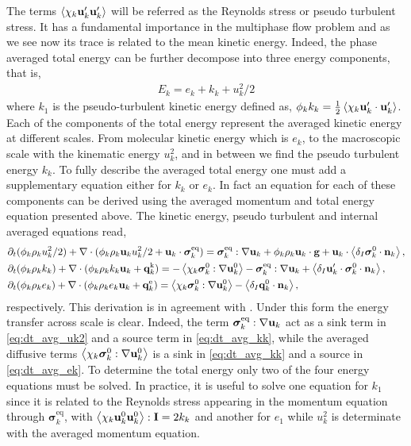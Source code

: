The terms $\left<\chi_k \textbf{u}_k'\textbf{u}_k'\right>$ will be referred as the Reynolds stress or pseudo turbulent stress. 
It has a fundamental importance in the multiphase flow problem and as we see now its trace is related to the mean kinetic energy. 
Indeed, the phase averaged total energy can be further decompose into three energy components, that is,  
\begin{align}
    E_k = e_k + k_k + u_k^2/2
    \label{eq:E_def}
\end{align}
where $k_1$ is the pseudo-turbulent kinetic energy defined as, $\phi_k k_k = \frac{1}{2}\left<\chi_k \textbf{u}_k'\cdot \textbf{u}_k'\right>$. 
Each of the components of the total energy represent the averaged kinetic energy at different scales. 
From molecular kinetic energy which is $e_k$, to the macroscopic scale with the kinematic energy $u_k^2$, and in between we find the pseudo turbulent energy $k_k$. 
To fully describe the averaged total energy one must add a supplementary equation either for $k_k$ or $e_k$. 
In fact an equation for each of these components can be derived using the averaged momentum and total energy equation presented above. 
The kinetic energy, pseudo turbulent and internal averaged equations read, 
\begin{align}
    \label{eq:dt_avg_uk2}
    &\partial_t (\phi_k \rho_ku_k^2/2)  
    + \mathbf{\nabla}\cdot (
        \phi_k \rho_k\textbf{u}_ku_k^2/2
        + \textbf{u}_k \cdot \bm{\sigma}_k^\text{eq}
    )
    = 
    \bm{\sigma}_k^\text{eq} : \mathbf{\nabla} \textbf{u}_k
    + \phi_k \rho_k \textbf{u}_k\cdot \textbf{g} 
    +  \textbf{u}_k\cdot \left<\delta_I \bm{\sigma}_k^0 \cdot \textbf{n}_k\right>,\\
    \label{eq:dt_avg_kk}
    &\partial_t (\phi_k\rho_kk_k)  
    + \mathbf{\nabla}\cdot (
        \phi_k\rho_kk_k\textbf{u}_k
        + \textbf{q}_k^\text{k} 
        )
    = 
    - \left<\chi_k\bm{\sigma}_k^0 : \mathbf{\nabla} \textbf{u}_k^0\right>
    - \bm{\sigma}_k^\text{eq} : \mathbf{\nabla} \textbf{u}_k
    + \left<\delta_I \textbf{u}_k' \cdot \bm{\sigma}_k^0 \cdot \textbf{n}_k\right>,\\
    \label{eq:dt_avg_ek}
    &\partial_t (\phi_k\rho_ke_k)  
    + \mathbf{\nabla}\cdot (
        \phi_k \rho_ke_k\textbf{u}_k
        +
        \textbf{q}_k^\text{e} 
        )
    = 
    \left<\chi_k\bm{\sigma}_k^0 : \mathbf{\nabla} \textbf{u}_k^0\right>
    - \left<\delta_I \textbf{q}_k^0 \cdot \textbf{n}_k\right>,
\end{align}
respectively. 
This derivation is in agreement with \citet{morel2015mathematical}. 
Under this form the energy transfer across scale is clear. 
Indeed, the term $\bm{\sigma}_k^\text{eq} : \mathbf{\nabla} \textbf{u}_k$ act as a sink term in \ref{eq:dt_avg_uk2} and a source term in \ref{eq:dt_avg_kk}, while the averaged diffusive terms $\left<\chi_k\bm{\sigma}_k^0 : \mathbf{\nabla} \textbf{u}_k^0\right>$ is a sink in \ref{eq:dt_avg_kk} and a source in \ref{eq:dt_avg_ek}. 
To determine the total energy only two of the four energy equations must be solved. 
In practice, it is useful to solve one equation for $k_1$ since it is related to the Reynolds stress appearing in the momentum equation through $\bm{\sigma}^\text{eq}_k$, with $\left<\chi_k \textbf{u}_k^0 \textbf{u}_k^0\right>: \textbf{I} = 2 k_k$ and another for $e_1$ while $u_k^2$ is determinate with the averaged momentum equation. 


